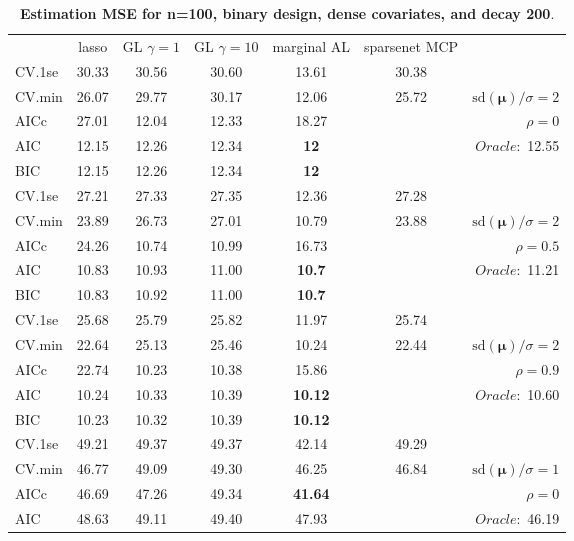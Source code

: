 \clearpage
\begin{table}\vspace{-.5cm}
\caption[l]{ { \bf Estimation MSE for n=100, binary design, 
dense covariates, and  decay  200}.}
\vspace{-.5cm}
\footnotesize{}
\begin{center}
\begin{tabular}{l*{5}{c}|r}
& lasso & GL $\gamma=1$ & GL $\gamma=10$ & marginal AL & sparsenet MCP  & \\
 \cline{1-7}
CV.1se & 30.33 & 30.56 & 30.60 & 13.61 & 30.38 & \\
CV.min & 26.07 & 29.77 & 30.17 & 12.06 & 25.72 &  $\mathrm{sd}(\mathbf{\mu})/\sigma=2$ \\
AICc & 27.01 & 12.04 & 12.33 & 18.27 & & $\rho=0$ \\
AIC & 12.15 & 12.26 & 12.34 & {\bf 12} & &  \multirow{2}{*}{$Oracle: $ 12.55} \\
BIC & 12.15 & 12.26 & 12.34 & {\bf 12} & &  \\
 \hline 
CV.1se & 27.21 & 27.33 & 27.35 & 12.36 & 27.28 & \\
CV.min & 23.89 & 26.73 & 27.01 & 10.79 & 23.88 &  $\mathrm{sd}(\mathbf{\mu})/\sigma=2$ \\
AICc & 24.26 & 10.74 & 10.99 & 16.73 & & $\rho=0.5$ \\
AIC & 10.83 & 10.93 & 11.00 & {\bf 10.7} & &  \multirow{2}{*}{$Oracle: $ 11.21} \\
BIC & 10.83 & 10.92 & 11.00 & {\bf 10.7} & &  \\
 \hline 
CV.1se & 25.68 & 25.79 & 25.82 & 11.97 & 25.74 & \\
CV.min & 22.64 & 25.13 & 25.46 & 10.24 & 22.44 &  $\mathrm{sd}(\mathbf{\mu})/\sigma=2$ \\
AICc & 22.74 & 10.23 & 10.38 & 15.86 & & $\rho=0.9$ \\
AIC & 10.24 & 10.33 & 10.39 & {\bf 10.12} & &  \multirow{2}{*}{$Oracle: $ 10.60} \\
BIC & 10.23 & 10.32 & 10.39 & {\bf 10.12} & &  \\
 \hline 
CV.1se & 49.21 & 49.37 & 49.37 & 42.14 & 49.29 & \\
CV.min & 46.77 & 49.09 & 49.30 & 46.25 & 46.84 &  $\mathrm{sd}(\mathbf{\mu})/\sigma=1$ \\
AICc & 46.69 & 47.26 & 49.34 & {\bf 41.64} & & $\rho=0$ \\
AIC & 48.63 & 49.11 & 49.40 & 47.93 & &  \multirow{2}{*}{$Oracle: $ 46.19} \\

\end{tabular}
\end{center}
\end{table}
